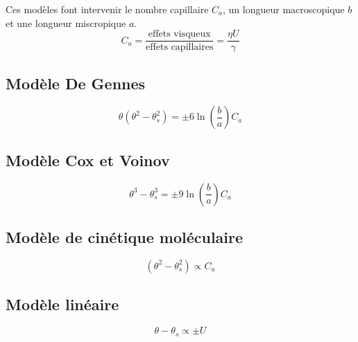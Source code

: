Ces modèles font intervenir le nombre capillaire $C_{a}$, un longueur macroscopique $b$ et une longueur miscropique $a$.
\begin{equation}
	C_{a} 
	= \frac{\text{effets visqueux}}{\text{effets capillaires}} 
	= \frac{\eta U}{\gamma}
\end{equation}
\subsection*{Modèle De Gennes} 

\begin{equation}
	\label{modele:gennes}
	\theta 
	\left(\theta^{2} - \theta_{s}^{2}\right) 
	= \pm 6\ln\left(\frac{b}{a}\right)C_{a}
\end{equation}
\subsection*{Modèle Cox et Voinov}  

\begin{equation}
	\label{modele:Cox}
	\theta^{3} - \theta_{s}^{3} = 
	\pm 
	9\ln\left(
	\frac{b}{a}\right) C_{a}
\end{equation}
\subsection*{Modèle de cinétique moléculaire}  

\begin{equation}
	\left(\theta^{2} - \theta_{s}^{2}\right) 
	\propto C_{a}
\end{equation}
\subsection*{Modèle linéaire} 

\begin{equation}
	\theta - \theta_{s} \propto \pm U
\end{equation}

